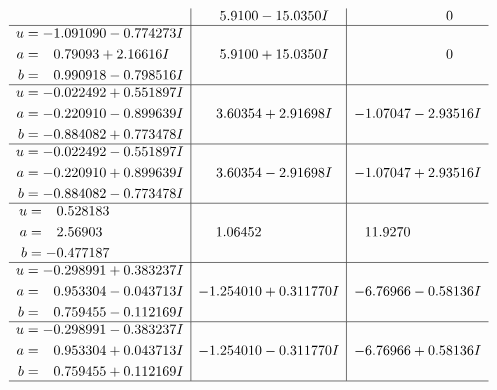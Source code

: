 \documentclass[1p]{elsarticle_modified}
\theoremstyle{definition}
\begin{document}
$$\begin{array}{c|c|c}
 & \phantom{-}5.9100 - 15.0350 I & \phantom{-0.000000 } 0 \\ \hline\begin{aligned}
u &= -1.091090 - 0.774273 I \\
a &= \phantom{-}0.79093 + 2.16616 I \\
b &= \phantom{-}0.990918 - 0.798516 I\end{aligned}
 & \phantom{-}5.9100 + 15.0350 I & \phantom{-0.000000 } 0 \\ \hline\begin{aligned}
u &= -0.022492 + 0.551897 I \\
a &= -0.220910 - 0.899639 I \\
b &= -0.884082 + 0.773478 I\end{aligned}
 & \phantom{-}3.60354 + 2.91698 I & -1.07047 - 2.93516 I \\ \hline\begin{aligned}
u &= -0.022492 - 0.551897 I \\
a &= -0.220910 + 0.899639 I \\
b &= -0.884082 - 0.773478 I\end{aligned}
 & \phantom{-}3.60354 - 2.91698 I & -1.07047 + 2.93516 I \\ \hline\begin{aligned}
u &= \phantom{-}0.528183\phantom{ +0.000000I} \\
a &= \phantom{-}2.56903\phantom{ +0.000000I} \\
b &= -0.477187\phantom{ +0.000000I}\end{aligned}
 & \phantom{-}1.06452\phantom{ +0.000000I} & \phantom{-}11.9270\phantom{ +0.000000I} \\ \hline\begin{aligned}
u &= -0.298991 + 0.383237 I \\
a &= \phantom{-}0.953304 - 0.043713 I \\
b &= \phantom{-}0.759455 - 0.112169 I\end{aligned}
 & -1.254010 + 0.311770 I & -6.76966 - 0.58136 I \\ \hline\begin{aligned}
u &= -0.298991 - 0.383237 I \\
a &= \phantom{-}0.953304 + 0.043713 I \\
b &= \phantom{-}0.759455 + 0.112169 I\end{aligned}
 & -1.254010 - 0.311770 I & -6.76966 + 0.58136 I\\
 \hline 
 \end{array}$$\newpage\newpage\renewcommand{\arraystretch}{1}
\end{document}
